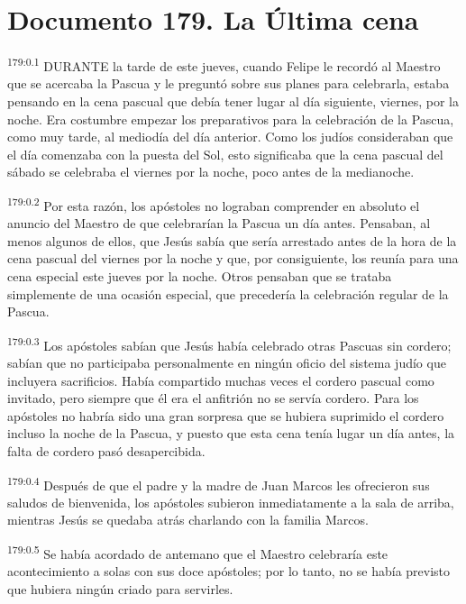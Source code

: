 \chapter{Documento 179. La Última cena}
\par
\textsuperscript{179:0.1} DURANTE la tarde de este jueves, cuando Felipe le recordó al Maestro que se acercaba la Pascua y le preguntó sobre sus planes para celebrarla, estaba pensando en la cena pascual que debía tener lugar al día siguiente, viernes, por la noche. Era costumbre empezar los preparativos para la celebración de la Pascua, como muy tarde, al mediodía del día anterior. Como los judíos consideraban que el día comenzaba con la puesta del Sol, esto significaba que la cena pascual del sábado se celebraba el viernes por la noche, poco antes de la medianoche.

\par
\textsuperscript{179:0.2} Por esta razón, los apóstoles no lograban comprender en absoluto el anuncio del Maestro de que celebrarían la Pascua un día antes. Pensaban, al menos algunos de ellos, que Jesús sabía que sería arrestado antes de la hora de la cena pascual del viernes por la noche y que, por consiguiente, los reunía para una cena especial este jueves por la noche. Otros pensaban que se trataba simplemente de una ocasión especial, que precedería la celebración regular de la Pascua.

\par
\textsuperscript{179:0.3} Los apóstoles sabían que Jesús había celebrado otras Pascuas sin cordero; sabían que no participaba personalmente en ningún oficio del sistema judío que incluyera sacrificios. Había compartido muchas veces el cordero pascual como invitado, pero siempre que él era el anfitrión no se servía cordero. Para los apóstoles no habría sido una gran sorpresa que se hubiera suprimido el cordero incluso la noche de la Pascua, y puesto que esta cena tenía lugar un día antes, la falta de cordero pasó desapercibida.

\par
\textsuperscript{179:0.4} Después de que el padre y la madre de Juan Marcos les ofrecieron sus saludos de bienvenida, los apóstoles subieron inmediatamente a la sala de arriba, mientras Jesús se quedaba atrás charlando con la familia Marcos.

\par
\textsuperscript{179:0.5} Se había acordado de antemano que el Maestro celebraría este acontecimiento a solas con sus doce apóstoles; por lo tanto, no se había previsto que hubiera ningún criado para servirles.

